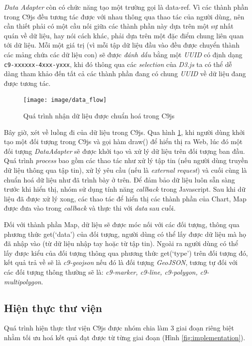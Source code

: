 \documentclass[12pt,a4paper]{article}
\begin{document}
\textit{Data Adapter} còn có chức năng tạo một trường gọi là \textsf{data-ref}. Vì các thành phần trong C9js đều tương tác được với nhau thông qua thao tác của người dùng, nên cần thiết phải có một cầu nối giữa các thành phần này dựa trên một sự nhất quán về dữ liệu, hay nói cách khác, phải dựa trên một đặc điểm chung liên quan tới dữ liệu. Mỗi một giá trị (vì mỗi tập dữ liệu đầu vào đều được chuyển thành các mảng chứa các dữ liệu con) sẽ được \textit{đánh dấu} bằng một \textit{UUID}\cite{uuid} có định dạng \texttt{c9-xxxxxx-4xxx-yxxx}, khi đó thông qua các \textit{selection} của \textit{D3.js} ta có thể dễ dàng tham khảo đến tất cả các thành phần đang có chung \textit{UUID} về dữ liệu đang được tương tác.

\begin{figure}[!h]
	\begin{center}
    \texttt{[image: image/data\_flow]}
    \caption{Quá trình nhận dữ liệu được chuẩn hoá trong C9js}
    \label{fig:data_flow}
	\end{center}
\end{figure}

Bây giờ, xét về luồng đi của dữ liệu trong C9js. Qua hình \ref{fig:data_flow}, khi người dùng khởi tạo một đối tượng trong C9js và gọi hàm \textsf{draw()} để hiển thị ra Web, lúc đó một đối tượng \textit{DataAdapter} sẽ được khởi tạo và xử lý dữ liệu trên đối tượng ban đầu. Quá trình \textit{process} bao gồm các thao tác như xử lý tập tin (nếu người dùng truyền dữ liệu thông qua tập tin), xử lý yêu cầu (nếu là \textit{external request}) và cuối cùng là chuẩn hoá dữ liệu như đã trình bày ở trên. Để đảm bảo dữ liệu luôn sẵn sàng trước khi hiển thị, nhóm sử dụng tính năng \textit{callback}\cite{callback} trong Javascript. Sau khi dữ liệu đã được xử lý xong, các thao tác để hiển thị các thành phần của Chart, Map được đưa vào trong \textit{callback} và thực thi với \textit{data} sau cuối.

Đối với thành phần Map, dữ liệu sẽ được móc nối với các đối tượng, thông qua phương thức \textsf{get(‘data’)} của đối tượng, người dùng có thể lấy được dữ liệu mà họ đã nhập vào (từ dữ liệu nhập tay hoặc từ tập tin). Ngoài ra người dùng có thể lấy được kiểu của đối tượng thông qua phương thức \textsf{get(‘type’)} trên đối tượng đó, kết quả trả về sẽ là \textit{c9-geojson} nếu đó là đối tượng \textit{GeoJSON}, tương tự đối với các đối tượng thông thường sẽ là: \textit{c9-marker, c9-line, c9-polygon, c9-multipolygon}.

\subsection{Hiện thực thư viện}
Quá trình hiện thực thư viện C9js được nhóm chia làm 3 giai đoạn riêng biệt nhằm tối ưu hoá kết quả đạt được từ từng giai đoạn (Hình \ref{fig:implementation}).
\end{document}
